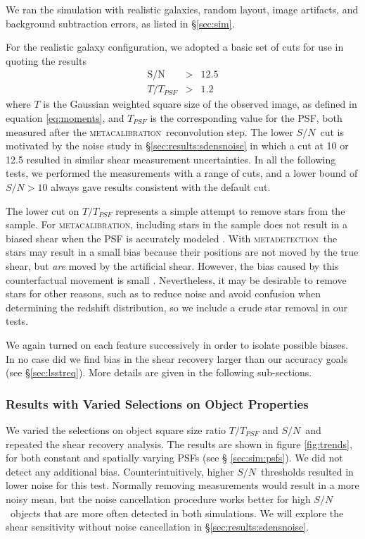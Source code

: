\documentclass[twocolumn,twocolappendix,astrosym]{openjournal}
\newcommand{\snr}{$S/N$}
\newcommand{\mcal}{\textsc{metacalibration}}
\newcommand{\mdet}{\textsc{metadetection}}
\begin{document}
We ran the simulation with realistic galaxies, random layout, image
artifacts, and background subtraction errors, as listed in \S \ref{sec:sim}.

For the realistic galaxy configuration, we adopted a basic set of cuts for use
in quoting the results
\begin{eqnarray} \label{eq:basiccuts}
    \mathrm{S/N} & > & 12.5 \\
    T/T_{PSF} & > & 1.2
\end{eqnarray}
where $T$ is the Gaussian weighted square size of the observed image, as
defined in equation \ref{eq:moments}, and $T_{PSF}$ is the corresponding value
for the PSF, both measured after the \mcal\ reconvolution step. The lower \snr\
cut is motivated by the noise study in \S \ref{sec:results:sdensnoise} in which
a cut at 10 or 12.5 resulted in similar shear measurement uncertainties. In all
the following tests, we performed the measurements with a range of cuts, and a
lower bound of $S/N > 10$ always gave results consistent with the default cut.

The lower cut on $T/T_{PSF}$ represents a simple attempt to remove stars from
the sample.  For \mcal, including stars in the sample does not result in a
biased shear when the PSF is accurately modeled \citep{SheldonMcal2017}.  With
\mdet\ the stars may result in a small bias because their positions are not
moved by the true shear, but {\it are} moved by the artificial shear. However,
the bias caused by this counterfactual movement is small \citep{mdet20}.
Nevertheless, it may be desirable to remove stars for other reasons, such as to
reduce noise and avoid confusion when determining the redshift distribution, so
we include a crude star removal in our tests.

We again turned on each feature successively in order to isolate possible
biases.  In no case did we find bias in the shear recovery larger than our
accuracy goals (see \S \ref{sec:lsstreq}).  More details are given in the
following sub-sections.

\subsubsection{Results with Varied Selections on Object Properties} \label{sec:results:select}

We varied the selections on object square size ratio $T/T_{PSF}$ and \snr\ and
repeated the shear recovery analysis.  The results are shown in figure
\ref{fig:trends}, for both constant and spatially varying PSFs (see \S
\ref{sec:sim:psfs}).  We did not detect any additional bias.
Counterintuitively, higher \snr\ thresholds resulted in lower noise for this
test.  Normally removing measurements would result in a more noisy mean, but
the noise cancellation procedure works better for high \snr\ objects that are
more often detected in both simulations.  We will explore the shear sensitivity
without noise cancellation in \S \ref{sec:results:sdensnoise}.
\end{document}

